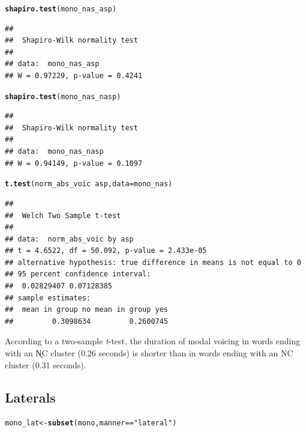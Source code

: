 \documentclass[a4paper,11pt]{article}\usepackage[]{graphicx}\usepackage[]{color}
\makeatletter
\newcommand{\hlstr}[1]{\textcolor[rgb]{0.192,0.494,0.8}{#1}}%
\newcommand{\hlopt}[1]{\textcolor[rgb]{0,0,0}{#1}}%
\newcommand{\hlstd}[1]{\textcolor[rgb]{0.345,0.345,0.345}{#1}}%
\newcommand{\hlkwb}[1]{\textcolor[rgb]{0.69,0.353,0.396}{#1}}%
\newcommand{\hlkwc}[1]{\textcolor[rgb]{0.333,0.667,0.333}{#1}}%
\newcommand{\hlkwd}[1]{\textcolor[rgb]{0.737,0.353,0.396}{\textbf{#1}}}%
\newenvironment{kframe}{%
 \def\at@end@of@kframe{}%
 \ifinner\ifhmode%
  \def\at@end@of@kframe{\end{minipage}}%
  \begin{minipage}{\columnwidth}%
 \fi\fi%
 \def\FrameCommand##1{\hskip\@totalleftmargin \hskip-\fboxsep
 \colorbox{shadecolor}{##1}\hskip-\fboxsep
     \hskip-\linewidth \hskip-\@totalleftmargin \hskip\columnwidth}%
 \MakeFramed {\advance\hsize-\width
   \@totalleftmargin\z@ \linewidth\hsize
   \@setminipage}}%
 {\par\unskip\endMakeFramed%
 \at@end@of@kframe}
\newenvironment{knitrout}{}{} %
\makeatother
\begin{document}
\begin{knitrout}
\color{fgcolor}\begin{kframe}
\begin{alltt}
\hlkwd{shapiro.test}\hlstd{(mono_nas_asp)}
\end{alltt}
\begin{verbatim}
## 
## 	Shapiro-Wilk normality test
## 
## data:  mono_nas_asp
## W = 0.97229, p-value = 0.4241
\end{verbatim}
\begin{alltt}
\hlkwd{shapiro.test}\hlstd{(mono_nas_nasp)}
\end{alltt}
\begin{verbatim}
## 
## 	Shapiro-Wilk normality test
## 
## data:  mono_nas_nasp
## W = 0.94149, p-value = 0.1097
\end{verbatim}
\begin{alltt}
\hlkwd{t.test}\hlstd{(norm_abs_voic} \hlopt{~} \hlstd{asp,} \hlkwc{data} \hlstd{= mono_nas)}
\end{alltt}
\begin{verbatim}
## 
## 	Welch Two Sample t-test
## 
## data:  norm_abs_voic by asp
## t = 4.6522, df = 50.092, p-value = 2.433e-05
## alternative hypothesis: true difference in means is not equal to 0
## 95 percent confidence interval:
##  0.02829407 0.07128385
## sample estimates:
##  mean in group no mean in group yes 
##         0.3098634         0.2600745
\end{verbatim}
\end{kframe}
\end{knitrout}

According to a two-sample \textit{t}-test, the duration of modal voicing in words ending with an N̥C cluster (0.26 seconds) is shorter than in words ending with an NC cluster (0.31 seconds).

\subsection{Laterals}

\begin{knitrout}
\color{fgcolor}\begin{kframe}
\begin{alltt}
\hlstd{mono_lat} \hlkwb{<-} \hlkwd{subset}\hlstd{(mono, manner} \hlopt{==} \hlstr{"lateral"}\hlstd{)}
\end{alltt}
\end{kframe}
\end{knitrout}
\end{document}
